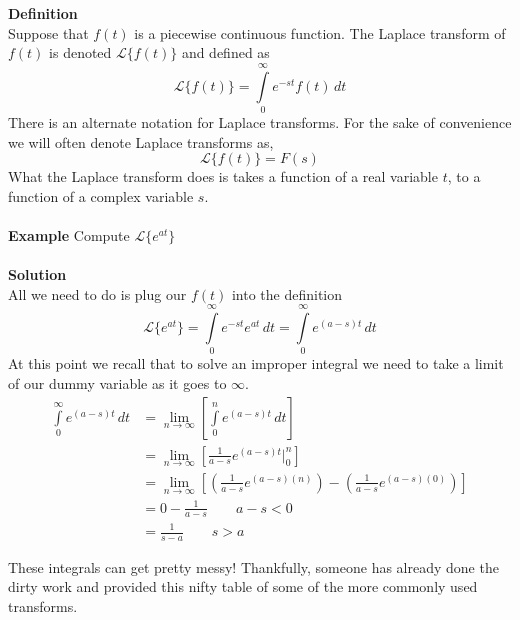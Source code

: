 \documentclass[10pt,reqno]{book}
\theoremstyle{definition}
\def\L{\mathscr{L}}
\begin{document}
	\noindent \textbf{Definition}\\
	 Suppose that $ f(t) $ is a piecewise continuous function. The Laplace transform of $ f(t) $ is denoted $ \L\{f(t)\} $ and defined as
	\begin{equation}
		\L\{f(t)\} = \int\limits_{0}^{\infty} e^{-st}f(t)\,dt
	\end{equation}
	There is an alternate notation for Laplace transforms.  For the sake of convenience we will often denote Laplace transforms as,
	\[ \L\{f(t)\} = F(s) \]
	What the Laplace transform does is takes a function of a real variable $ t $, to a function of a complex variable $ s $.\\ \\
	\noindent \textbf{Example} Compute $ \L\{e^{at}\} $\\ \\
	\noindent \textbf{Solution}\\
	All we need to do is plug our $ f(t) $ into the definition
	\[ \L\{e^{at}\} = \int\limits_{0}^{\infty} e^{-st} e^{at}\,dt = \int\limits_{0}^{\infty} e^{(a-s)t}\,dt \]
	At this point we recall that to solve an improper integral we need to take a limit of our dummy variable as it goes to $ \infty $.
	\begin{align*}
		\int\limits_{0}^{\infty} e^{(a-s)t}\,dt &= \lim_{n\to\infty} \left[ \int\limits_{0}^{n} e^{(a-s)t}\,dt \right]\\
		&= \lim_{n\to\infty} \left[ \frac{1}{a-s} e^{(a-s)t} \Big|_{0}^{n}\right]\\
		&= \lim_{n\to\infty} \left[\left( \frac{1}{a-s}e^{(a-s)(n)} \right) - \left( \frac{1}{a-s}e^{(a-s)(0)} \right) \right]\\
		&= 0 - \frac{1}{a-s} \qquad a -s < 0\\
		&= \frac{1}{s- a} \qquad s > a
	\end{align*}
	
	\noindent These integrals can get pretty messy! Thankfully, someone has already done the dirty work and provided this nifty table of some of the more commonly used transforms.
	
\end{document}
